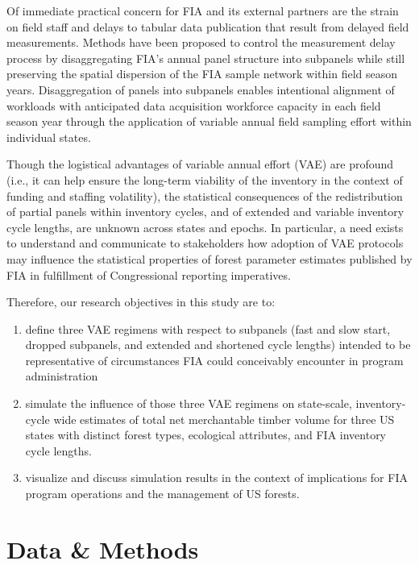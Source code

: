 \documentclass[
  number]{elsarticle}
\providecommand{\tightlist}{%
  \setlength{\itemsep}{0pt}\setlength{\parskip}{0pt}}
\begin{document}
Of immediate practical concern for FIA and its external partners are the
strain on field staff and delays to tabular data publication that result
from delayed field measurements. Methods have been proposed to control
the measurement delay process by disaggregating FIA's annual panel
structure into subpanels while still preserving the spatial dispersion
of the FIA sample network within field season years. Disaggregation of
panels into subpanels enables intentional alignment of workloads with
anticipated data acquisition workforce capacity in each field season
year through the application of variable annual field sampling effort
within individual states.

Though the logistical advantages of variable annual effort (VAE) are
profound (i.e., it can help ensure the long-term viability of the
inventory in the context of funding and staffing volatility), the
statistical consequences of the redistribution of partial panels within
inventory cycles, and of extended and variable inventory cycle lengths,
are unknown across states and epochs. In particular, a need exists to
understand and communicate to stakeholders how adoption of VAE protocols
may influence the statistical properties of forest parameter estimates
published by FIA in fulfillment of Congressional reporting imperatives.

Therefore, our research objectives in this study are to:

\begin{enumerate}
\def\labelenumi{\arabic{enumi}.}
\tightlist
\item
  define three VAE regimens with respect to subpanels (fast and slow
  start, dropped subpanels, and extended and shortened cycle lengths)
  intended to be representative of circumstances FIA could conceivably
  encounter in program administration
\item
  simulate the influence of those three VAE regimens on state-scale,
  inventory-cycle wide estimates of total net merchantable timber volume
  for three US states with distinct forest types, ecological attributes,
  and FIA inventory cycle lengths.
\item
  visualize and discuss simulation results in the context of
  implications for FIA program operations and the management of US
  forests.
\end{enumerate}

\section{Data \& Methods}\label{sec-data-methods}
\end{document}
